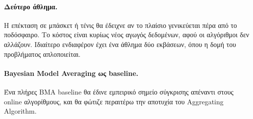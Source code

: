 \documentclass[12pt,a4paper,oneside]{report}
\renewcommand{\_}{\oldunderscore\allowbreak}
\theoremstyle{definition}
\theoremstyle{plain}
\theoremstyle{remark}
\begin{document}
\paragraph{Δεύτερο άθλημα.} Η επέκταση σε μπάσκετ ή τένις θα έδειχνε αν το πλαίσιο
γενικεύεται πέρα από το ποδόσφαιρο. Το κόστος είναι κυρίως νέος αγωγός δεδομένων, αφού οι
αλγόριθμοι δεν αλλάζουν. Ιδιαίτερο ενδιαφέρον έχει ένα άθλημα δύο εκβάσεων, όπου η δομή του
προβλήματος απλοποιείται.

\paragraph{Bayesian Model Averaging ως baseline.} Ένα πλήρες BMA baseline θα έδινε εμπειρικό
σημείο σύγκρισης απέναντι στους online αλγορίθμους, και θα φώτιζε περαιτέρω την αποτυχία του
Aggregating Algorithm.

\appendix

\end{document}
